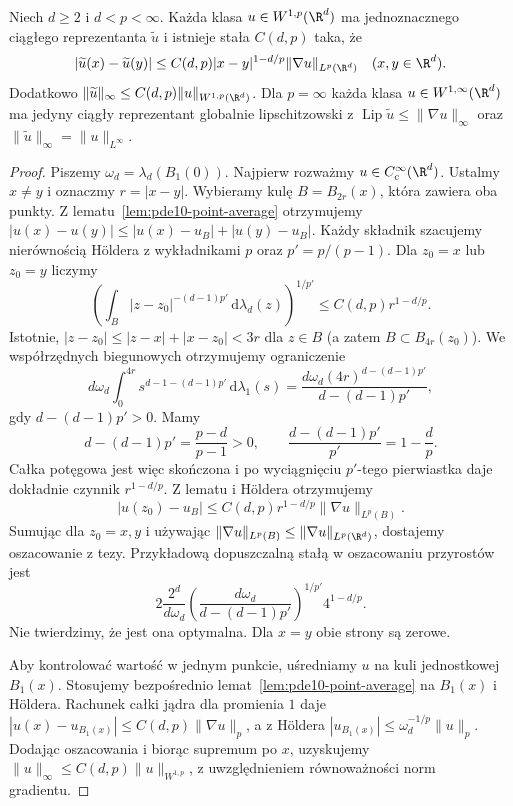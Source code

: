 \begin{twierdzenie}[Morrey na $\R^d$]
\label{thm:pde10-Morrey}
Niech $d\ge2$ i $d<p<\infty$. Każda klasa
$u\in W^{1,p}(\R^d)$ ma jednoznacznego ciągłego
reprezentanta $\widetilde u$ i istnieje stała $C(d,p)$ taka, że
\[
 |\widetilde u(x)-\widetilde u(y)|
 \le C(d,p)|x-y|^{1-d/p}\|\nabla u\|_{L^p(\R^d)}
 \quad(x,y\in\R^d).
\]
Dodatkowo $\|\widetilde u\|_\infty\le
 C(d,p)\|u\|_{W^{1,p}(\R^d)}$.
Dla $p=\infty$ każda klasa $u\in W^{1,\infty}(\R^d)$
ma jedyny ciągły reprezentant globalnie lipschitzowski
z $\operatorname{Lip}\widetilde u\le\|\nabla u\|_\infty$
oraz $\|\widetilde u\|_\infty=\|u\|_{L^\infty}$.
\end{twierdzenie}
\begin{proof}
Piszemy $\omega_d=\lambda_d(B_1(0))$.
Najpierw rozważmy $u\in C_c^\infty(\R^d)$. Ustalmy
$x\ne y$ i oznaczmy $r=|x-y|$.
Wybieramy kulę $B=B_{2r}(x)$, która zawiera oba punkty.
Z lematu~\ref{lem:pde10-point-average} otrzymujemy
$|u(x)-u(y)|\le|u(x)-u_B|+|u(y)-u_B|$.
Każdy składnik szacujemy nierównością Höldera
z wykładnikami $p$ oraz $p'=p/(p-1)$.
Dla $z_0=x$ lub $z_0=y$ liczymy
\[
 \left(\int_B |z-z_0|^{-(d-1)p'}
 \,\mathrm d\lambda_d(z)\right)^{1/p'}
 \le C(d,p)r^{1-d/p}.
\]
Istotnie, $|z-z_0|\le |z-x|+|x-z_0|<3r$
dla $z\in B$ (a zatem $B\subset B_{4r}(z_0)$).
We współrzędnych biegunowych otrzymujemy ograniczenie
\[
 d\omega_d\int_0^{4r}s^{d-1-(d-1)p'}\,\mathrm d\lambda_1(s)
 =\frac{d\omega_d(4r)^{d-(d-1)p'}}{d-(d-1)p'},
\]
gdy $d-(d-1)p'>0$.
Mamy
\[
 d-(d-1)p'=\frac{p-d}{p-1}>0,\qquad
 \frac{d-(d-1)p'}{p'}=1-\frac dp.
\]
Całka potęgowa jest więc skończona i po wyciągnięciu
$p'$-tego pierwiastka daje dokładnie czynnik
$r^{1-d/p}$. Z lematu i Höldera otrzymujemy
\[
 |u(z_0)-u_B|\le C(d,p)r^{1-d/p}\|\nabla u\|_{L^p(B)}.
\]
Sumując dla $z_0=x,y$ i używając
$\|\nabla u\|_{L^p(B)}\le\|\nabla u\|_{L^p(\R^d)}$,
dostajemy oszacowanie z tezy. Przykładową dopuszczalną
stałą w oszacowaniu przyrostów jest
\[
 2\frac{2^d}{d\omega_d}
 \left(\frac{d\omega_d}{d-(d-1)p'}\right)^{1/p'}
 4^{1-d/p}.
\]
Nie twierdzimy, że jest ona optymalna.
Dla $x=y$ obie strony są zerowe.

Aby kontrolować wartość w jednym punkcie,
uśredniamy $u$ na kuli jednostkowej $B_1(x)$.
Stosujemy bezpośrednio lemat~\ref{lem:pde10-point-average}
na $B_1(x)$ i Höldera. Rachunek całki jądra dla promienia
$1$ daje $|u(x)-u_{B_1(x)}|\le C(d,p)\|\nabla u\|_p$,
a z Höldera $|u_{B_1(x)}|\le\omega_d^{-1/p}\|u\|_p$.
Dodając oszacowania i biorąc supremum po $x$, uzyskujemy
$\|u\|_\infty\le C(d,p)\|u\|_{W^{1,p}}$,
z uwzględnieniem równoważności norm gradientu.


\end{proof}
